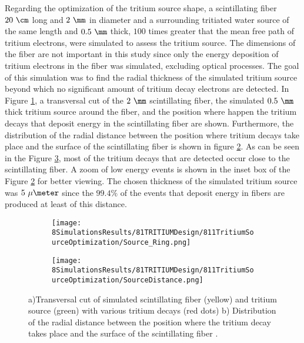 Regarding the optimization of the tritium source shape, a scintillating fiber $20~\cm$ long and $2~\mm$ in diameter and a surrounding tritiated water source of the same length and $0.5~\mm$ thick, $100$ times greater that the mean free path of tritium electrons, were simulated to assess the tritium source. The dimensions of the fiber are not important in this study since only the energy deposition of tritium electrons in the fiber was simulated, excluding optical processes. The goal of this simulation was to find the radial thickness of the simulated tritium source beyond which no significant amount of tritium decay electrons are detected. In Figure \ref{subfig:TransversalCutTritiumSource}, a transversal cut of the $2~\mm$ scintillating fiber, the simulated $0.5~\mm$ thick tritium source around the fiber, and the position where happen the tritium decays that deposit energy in the scintillating fiber are shown. Furthermore, the distribution of the radial distance between the position where tritium decays take place and the surface of the scintillating fiber is shown in figure \ref{subfig:DistanceDistributionTritiumSourceFiber}. As can be seen in the Figure \ref{fig:TritiumSourceSimulated}, most of the tritium decays that are detected occur close to the scintillating fiber.  A zoom of low energy events is shown in the inset box of the Figure \ref{subfig:DistanceDistributionTritiumSourceFiber} for better viewing. The chosen thickness of the simulated tritium source was $5~\mu\meter$ since the $99.4\%$ of the events that deposit energy in fibers are produced at least of this distance.

\begin{figure}
\centering
    \begin{subfigure}[b]{0.45\textwidth}
    \centering
    \texttt{[image: 8SimulationsResults/81TRITIUMDesign/811TritiumSourceOptimization/Source\_Ring.png]}  
    \caption{\label{subfig:TransversalCutTritiumSource}}
    \end{subfigure}
    \hfill
    \begin{subfigure}[b]{0.45\textwidth}
    \centering
    \texttt{[image: 8SimulationsResults/81TRITIUMDesign/811TritiumSourceOptimization/SourceDistance.png]}  
    \caption{\label{subfig:DistanceDistributionTritiumSourceFiber}}
    \end{subfigure}
 \caption{a)Transversal cut of simulated scintillating fiber (yellow) and tritium source (green) with various tritium decays (red dots) b) Distribution of the radial distance between the position where the tritium decay takes place and the surface of the scintillating fiber \cite{SimulationPaperCarlos}.}
 \label{fig:TritiumSourceSimulated}
\end{figure}	

